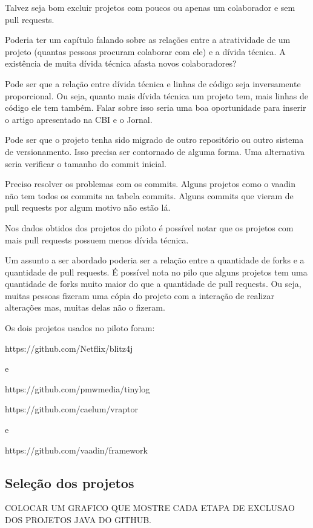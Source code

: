 Talvez seja bom excluir projetos com poucos ou apenas um colaborador e sem pull requests. 


Poderia ter um capítulo falando sobre as relações entre a atratividade de um projeto (quantas pessoas procuram colaborar com ele) e a dívida técnica.
A existência de muita dívida técnica afasta novos colaboradores?


Pode ser que a relação entre dívida técnica e linhas de código seja inversamente proporcional. Ou seja, quanto mais dívida técnica um projeto tem, mais linhas de código ele tem também. Falar sobre isso seria uma boa oportunidade para inserir o artigo apresentado na CBI e o Jornal.

Pode ser que o projeto tenha sido migrado de outro repositório ou outro sistema de versionamento. Isso precisa ser contornado de alguma forma. Uma alternativa seria verificar o tamanho do commit inicial.


Preciso resolver os problemas com os commits. Alguns projetos como o vaadin não tem todos os commits na tabela commits. Alguns commits que vieram de pull requests por algum motivo não estão lá.

Nos dados obtidos dos projetos do piloto é possível notar que os projetos com mais pull requests possuem menos dívida técnica.

Um assunto a ser abordado poderia ser a relação entre a quantidade de forks e a quantidade de pull requests. É possível nota no pilo que alguns projetos tem uma quantidade de forks muito maior do que a quantidade de pull requests. Ou seja, muitas pessoas fizeram uma cópia do projeto com a interação de realizar alterações mas, muitas delas não o fizeram.

Os dois projetos usados no piloto foram:

https://github.com/Netflix/blitz4j

e

https://github.com/pmwmedia/tinylog



https://github.com/caelum/vraptor

e 

https://github.com/vaadin/framework


\subsection{Seleção dos projetos}

COLOCAR UM GRAFICO QUE MOSTRE CADA ETAPA DE EXCLUSAO DOS PROJETOS JAVA DO GITHUB.

